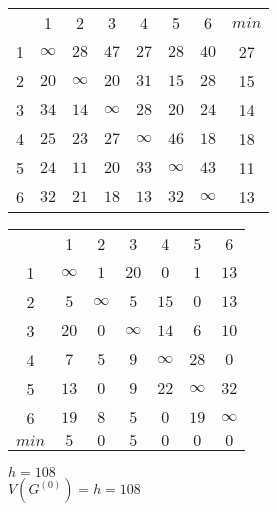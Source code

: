 \begin{table}[H]
\begin{center}
	\def\tabcolsep{18pt}
	\def\arraystretch{1.5}
	\fontsize{13}{14}\selectfont
	\begin{tabular}{|c||c|c|c|c|c|c||c|}
		\hline 
	  	& 1 & 2 & 3 & 4 & 5 & 6 & $min$ \\ 
		\hhline{|=#=|=|=|=|=|=#=|} 
		1 & $\infty$ & $28$ & $47$ & $27$ & $28$ & $40$ & 27\\ 
		\hline 
		2 & $20$ & $\infty$ & $20$ & $31$ & $15$ & $28$ & 15\\ 
		\hline 
		3 & $34$ & $14$ & $\infty$ & $28$ & $20$ & $24$ & 14\\ 
		\hline 
		4 & $25$ & $23$ & $27$ & $\infty$ & $46$ & $18$ & 18\\ 
		\hline 
		5 & $24$ & $11$ & $20$ & $33$ & $\infty$ & $43$ & 11\\ 
		\hline 
		6 & $32$ & $21$ & $18$ & $13$ & $32$ & $\infty$ & 13\\ 
		\hline 
	\end{tabular}  
\end{center}
\end{table} 

\begin{table}[H]
\begin{center}
	\def\tabcolsep{18pt}
	\def\arraystretch{1.5}
	\fontsize{13}{14}\selectfont
	\begin{tabular}{|c||c|c|c|c|c|c|}
		\hline 
	  	& 1 & 2 & 3 & 4 & 5 & 6 \\ 
		\hhline{|=#=|=|=|=|=|=|} 
		1 & $\infty$ & $1$ & $20$ & $0$ & $1$ & $13$ \\ 
		\hline 
		2 & $5$ & $\infty$ & $5$ & $15$ & $0$ & $13$ \\ 
		\hline 
		3 & $20$ & $0$ & $\infty$ & $14$ & $6$ & $10$ \\ 
		\hline 
		4 & $7$ & $5$ & $9$ & $\infty$ & $28$ & $0$ \\ 
		\hline 
		5 & $13$ & $0$ & $9$ & $22$ & $\infty$ & $32$ \\ 
		\hline 
		6 & $19$ & $8$ & $5$ & $0$ & $19$ & $\infty$ \\ 
		\hhline{|=#=|=|=|=|=|=|}
		$min$ & $5$ & $0$ & $5$ & $0$ & $0$ & $0$ \\
		\hline
	\end{tabular}  
\end{center}
\end{table} 

\noindent $h = 108$\\
$V(G^{(0)}) = h = 108$

